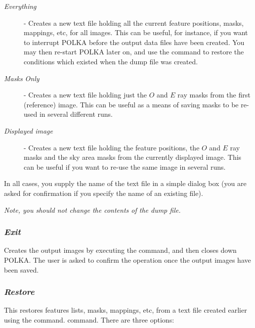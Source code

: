 \documentclass[11pt,nolof]{starlink}
\providecommand{\mylabel}[1] {\xlabel{#1}\label{#1}}
\begin{document}
\begin{description}

\item [\emph{Everything}] - Creates a new text file holding all the current
feature positions, masks, mappings, etc, for all images. This can be useful,
for instance, if you want to interrupt POLKA before the output data files
have been created. You may then re-start POLKA later on, and use the
 command to restore the conditions
which existed when the dump file was created.

\item [\emph{Masks Only}] - Creates a new text file holding just the $O$
and $E$ ray masks from the first (reference) image. This can be useful
as a means of saving masks to be re-used in several different runs.

\item [\emph{Displayed image}] - Creates a new text file holding the
feature positions, the $O$ and $E$ ray masks and the sky area masks from the
currently displayed image. This can be useful if you want to re-use the
same image in several runs.

\end{description}

In all cases, you supply the name of the text file in a simple dialog
box (you are asked for confirmation if you specify the name of an
existing file).

\emph{{\center Note, you should not change the contents of the dump file.}}

\subsubsection {\mylabel{POLKA_EXIT}\emph{Exit}} Creates the output images by executing
the  command, and then closes down
POLKA. The user is asked to confirm the operation once the output images
have been saved.

\subsubsection {\mylabel{POLKA_RESTORE}\emph{Restore}}
This restores features lists, masks, mappings, etc, from a text file
created earlier using the  command.
 command. There are three
options:
\end{document}
